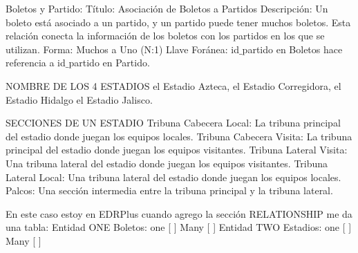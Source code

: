 Boletos y Partido:
Título: Asociación de Boletos a Partidos
Descripción: Un boleto está asociado a un partido, y un partido puede tener muchos boletos. Esta relación conecta la información de los boletos con los partidos en los que se utilizan.
Forma: Muchos a Uno (N:1)
Llave Foránea: id$\_$partido en Boletos hace referencia a id$\_$partido en Partido.


NOMBRE DE LOS 4 ESTADIOS
el Estadio Azteca,
el Estadio Corregidora,
el Estadio Hidalgo
el Estadio Jalisco.

SECCIONES DE UN ESTADIO
Tribuna Cabecera Local: La tribuna principal del estadio donde juegan los equipos locales.
Tribuna Cabecera Visita: La tribuna principal del estadio donde juegan los equipos visitantes.
Tribuna Lateral Visita: Una tribuna lateral del estadio donde juegan los equipos visitantes.
Tribuna Lateral Local: Una tribuna lateral del estadio donde juegan los equipos locales.
Palcos: Una sección intermedia entre la tribuna principal y la tribuna lateral.



En este caso estoy en EDRPlus 
cuando agrego la sección RELATIONSHIP me da una tabla:
Entidad ONE
 Boletos: 
               one [ ]
               Many [ ]
Entidad TWO
 Estadios: 
               one [ ]
               Many [ ]

